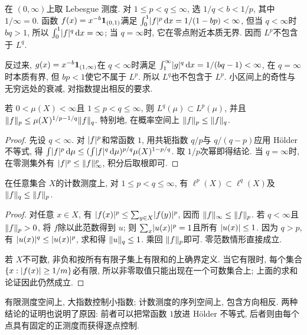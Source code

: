 
\begin{example}\label{ra:c5:no-inclusions}
在 $(0,\infty)$上取 Lebesgue 测度. 对 $1\le p<q\le\infty$, 选 $1/q<b<1/p$, 其中 $1/\infty=0$. 函数 $f(x)=x^{-b}\mathbf 1_{(0,1)}$满足 $\int_0^1\lvert f\rvert^p\,\mathrm d x=1/(1-bp)<\infty$, 但当 $q<\infty$时 $bq>1$, 所以 $\int_0^1\lvert f\rvert^q\,\mathrm d x=\infty$; 当 $q=\infty$时, 它在零点附近本质无界. 因而 $L^p$不包含于 $L^q$.

反过来, $g(x)=x^{-b}\mathbf 1_{(1,\infty)}$在 $q<\infty$时满足 $\int_1^\infty\lvert g\rvert^q\,\mathrm d x=1/(bq-1)<\infty$, 在 $q=\infty$时本质有界, 但 $bp<1$使它不属于 $L^p$. 所以 $L^q$也不包含于 $L^p$. 小区间上的奇性与无穷远处的衰减, 对指数提出相反的要求.
\end{example}

\begin{theorem}\label{ra:c5:finite-inclusion}
若 $0<\mu(X)<\infty$且 $1\le p<q\le\infty$, 则 $L^q(\mu)\subset L^p(\mu)$, 并且 $\lVert f\rVert_p\le\mu(X)^{1/p-1/q}\lVert f\rVert_q$.
特别地, 在概率空间上 $\lVert f\rVert_p\le\lVert f\rVert_q$.
\end{theorem}
\begin{proof}
先设 $q<\infty$. 对 $\lvert f\rvert^p$和常函数 $1$, 用共轭指数 $q/p$与 $q/(q-p)$应用 Hölder 不等式, 得 $\int\lvert f\rvert^p\,\mathrm d\mu\le(\int\lvert f\rvert^q\,\mathrm d\mu)^{p/q}\mu(X)^{1-p/q}$. 取 $1/p$次幂即得结论. 当 $q=\infty$时, 在零测集外有 $\lvert f\rvert^p\le\lVert f\rVert_\infty^p$, 积分后取根即可.
\end{proof}

\begin{theorem}\label{ra:c5:sequence-inclusion}
在任意集合 $X$的计数测度上, 对 $1\le p<q\le\infty$, 有 $\ell^p(X)\subset\ell^q(X)$及 $\lVert f\rVert_q\le\lVert f\rVert_p$.
\end{theorem}
\begin{proof}
对任意 $x\in X$, 有 $\lvert f(x)\rvert^p\le\sum_{y\in X}\lvert f(y)\rvert^p$, 因而 $\lVert f\rVert_\infty\le\lVert f\rVert_p$. 若 $q<\infty$且 $\lVert f\rVert_p>0$, 将 $f$除以此范数得到 $u$; 则 $\sum_x\lvert u(x)\rvert^p=1$且所有 $\lvert u(x)\rvert\le1$. 因为 $q>p$, 有 $\lvert u(x)\rvert^q\le\lvert u(x)\rvert^p$, 求和得 $\lVert u\rVert_q\le1$. 乘回 $\lVert f\rVert_p$即可. 零范数情形直接成立.

若 $X$不可数, 非负和按所有有限子集上有限和的上确界定义. 当它有限时, 每个集合 $\{x:\lvert f(x)\rvert\ge1/m\}$必有限, 所以非零取值只能出现在一个可数集合上; 上面的求和论证因此仍然成立.
\end{proof}

有限测度空间上, 大指数控制小指数; 计数测度的序列空间上, 包含方向相反. 两种结论的证明也说明了原因: 前者可以把常函数 $1$放进 Hölder 不等式, 后者则由每个点具有固定的正测度而获得逐点控制.

